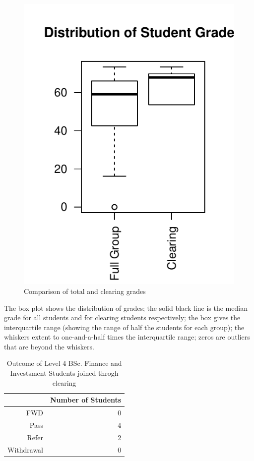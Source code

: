 \documentclass[12pt, a4paper, oneside]{article}\usepackage[]{graphicx}\usepackage[]{color}
\makeatletter
\def\maxwidth{ %
  \ifdim\Gin@nat@width>\linewidth
    \linewidth
  \else
    \Gin@nat@width
  \fi
}
\newenvironment{knitrout}{}{} %
\makeatother
\begin{document}
\begin{knitrout}
\color{fgcolor}\begin{figure}[h]

\includegraphics[width=\maxwidth]{figure/boxplot1} \caption[Comparison of total and clearing grades]{Comparison of total and clearing grades\label{fig:boxplot1}}
\end{figure}


\end{knitrout}
The box plot shows the distribution of grades; the solid black line is the median grade for all students and for clearing students respectively; the box gives the interquartile range (showing the range of half the students for each group); the whiskers extent to one-and-a-half times the interquartile range; zeros are outliers that are beyond the whiskers. 

\begin{table}[ht]
\centering
\begin{tabular}{rr}
  \hline
 & Number of Students \\ 
  \hline
FWD &   0 \\ 
  Pass &   4 \\ 
  Refer &   2 \\ 
  Withdrawal &   0 \\ 
   \hline
\end{tabular}
\caption{Outcome of Level 4 BSc. Finance and Investsment Students joined throgh clearing} 
\label{tabref:out2}
\end{table}
\end{document}
